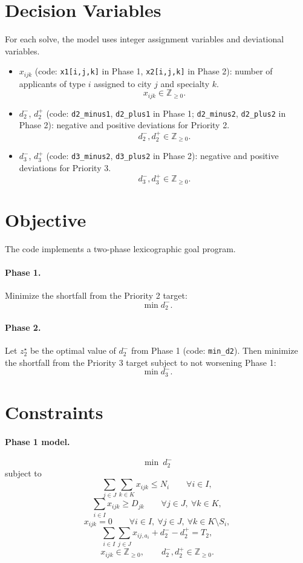 \section*{Decision Variables}

For each solve, the model uses integer assignment variables and deviational variables.

\begin{itemize}
\item $x_{ijk}$ (code: \texttt{x1[i,j,k]} in Phase 1, \texttt{x2[i,j,k]} in Phase 2): number of applicants of type $i$ assigned to city $j$ and specialty $k$.
\[
x_{ijk}\in \mathbb{Z}_{\ge 0}.
\]

\item $d_2^-$, $d_2^+$ (code: \texttt{d2\_minus1}, \texttt{d2\_plus1} in Phase 1; \texttt{d2\_minus2}, \texttt{d2\_plus2} in Phase 2): negative and positive deviations for Priority 2.
\[
d_2^-,d_2^+\in \mathbb{Z}_{\ge 0}.
\]

\item $d_3^-$, $d_3^+$ (code: \texttt{d3\_minus2}, \texttt{d3\_plus2} in Phase 2): negative and positive deviations for Priority 3.
\[
d_3^-,d_3^+\in \mathbb{Z}_{\ge 0}.
\]
\end{itemize}

\section*{Objective}

The code implements a two-phase lexicographic goal program.

\paragraph{Phase 1.}
Minimize the shortfall from the Priority 2 target:
\[
\min d_2^- .
\]

\paragraph{Phase 2.}
Let $z_2^\star$ be the optimal value of $d_2^-$ from Phase 1 (code: \texttt{min\_d2}). Then minimize the shortfall from the Priority 3 target subject to not worsening Phase 1:
\[
\min d_3^- .
\]

\section*{Constraints}

\paragraph{Phase 1 model.}
\[
\min \ d_2^-
\]
subject to
\[
\sum_{j\in J}\sum_{k\in K} x_{ijk} \le N_i \qquad \forall i\in I,
\]
\[
\sum_{i\in I} x_{ijk} \ge D_{jk} \qquad \forall j\in J,\ \forall k\in K,
\]
\[
x_{ijk}=0 \qquad \forall i\in I,\ \forall j\in J,\ \forall k\in K\setminus S_i,
\]
\[
\sum_{i\in I}\sum_{j\in J} x_{ij,a_i} + d_2^- - d_2^+ = T_2,
\]
\[
x_{ijk}\in \mathbb{Z}_{\ge 0},\qquad d_2^-,d_2^+\in \mathbb{Z}_{\ge 0}.
\]

